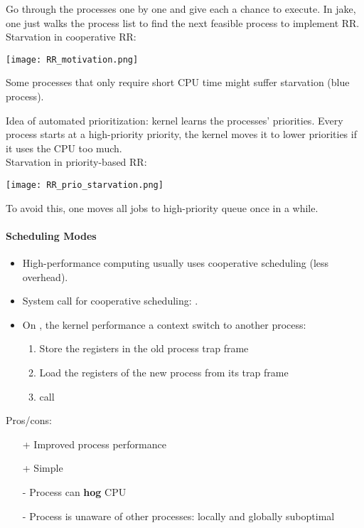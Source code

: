 Go through the processes one by one and give each a chance to execute. In jake, one just walks the process list to find the next feasible process to implement RR.\\
Starvation in cooperative RR:
\begin{center}
    \texttt{[image: RR\_motivation.png]}
\end{center}
Some processes that only require short CPU time might suffer starvation (blue process).

\newpar{}

Idea of automated prioritization: kernel learns the processes' priorities. Every process starts at a high-priority priority, the kernel moves it to lower priorities if it uses the CPU too much.\\
Starvation in priority-based RR:
\begin{center}
    \texttt{[image: RR\_prio\_starvation.png]}
\end{center}
To avoid this, one moves all jobs to high-priority queue once in a while.

\paragraph{Scheduling Modes}

\newpar{}

\begin{itemize}
    \item High-performance computing usually uses cooperative scheduling (less overhead).
    \item System call for cooperative scheduling: .
    \item On , the kernel performance a context switch to another process:
          \begin{enumerate}
              \item Store the registers in the old process trap frame
              \item Load the registers of the new process from its trap frame
              \item call 
          \end{enumerate}
\end{itemize}
Pros/cons:
\begin{itemize}
    \item[+] Improved process performance
    \item[+] Simple
    \item[-] Process can \textbf{hog} CPU
    \item[-] Process is unaware of other processes: locally and globally suboptimal
\end{itemize}

